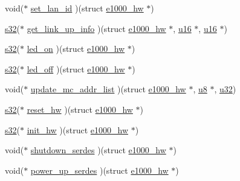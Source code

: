 \begin{DoxyCompactItemize}
\item 
void($\ast$ \hyperlink{structe1000__mac__operations_aa4701bf39adeb17df4723d7c8873eb51}{set\+\_\+lan\+\_\+id} )(struct \hyperlink{structe1000__hw}{e1000\+\_\+hw} $\ast$)
\item 
\hyperlink{lib_2igb_2e1000__osdep_8h_ae9b1af5c037e57a98884758875d3a7c4}{s32}($\ast$ \hyperlink{structe1000__mac__operations_ac33be4d35ec01cf9ebc0942a06c6e353}{get\+\_\+link\+\_\+up\+\_\+info} )(struct \hyperlink{structe1000__hw}{e1000\+\_\+hw} $\ast$, \hyperlink{lib_2igb_2e1000__osdep_8h_acdc9cf0314be0ae5a01d6d4379a95edd}{u16} $\ast$, \hyperlink{lib_2igb_2e1000__osdep_8h_acdc9cf0314be0ae5a01d6d4379a95edd}{u16} $\ast$)
\item 
\hyperlink{lib_2igb_2e1000__osdep_8h_ae9b1af5c037e57a98884758875d3a7c4}{s32}($\ast$ \hyperlink{structe1000__mac__operations_a1130a8a99a00a299152c532190a24ba1}{led\+\_\+on} )(struct \hyperlink{structe1000__hw}{e1000\+\_\+hw} $\ast$)
\item 
\hyperlink{lib_2igb_2e1000__osdep_8h_ae9b1af5c037e57a98884758875d3a7c4}{s32}($\ast$ \hyperlink{structe1000__mac__operations_a30ddd0007e69abb1c3e0f27a3204c3e4}{led\+\_\+off} )(struct \hyperlink{structe1000__hw}{e1000\+\_\+hw} $\ast$)
\item 
void($\ast$ \hyperlink{structe1000__mac__operations_a7da80f37f7dab7ae01648393f3d200c2}{update\+\_\+mc\+\_\+addr\+\_\+list} )(struct \hyperlink{structe1000__hw}{e1000\+\_\+hw} $\ast$, \hyperlink{lib_2igb_2e1000__osdep_8h_a8baca7e76da9e0e11ce3a275dd19130c}{u8} $\ast$, \hyperlink{lib_2igb_2e1000__osdep_8h_a64e91c10a0d8fb627e92932050284264}{u32})
\item 
\hyperlink{lib_2igb_2e1000__osdep_8h_ae9b1af5c037e57a98884758875d3a7c4}{s32}($\ast$ \hyperlink{structe1000__mac__operations_ab1bc8ebd08e9e205a337150d76b68a18}{reset\+\_\+hw} )(struct \hyperlink{structe1000__hw}{e1000\+\_\+hw} $\ast$)
\item 
\hyperlink{lib_2igb_2e1000__osdep_8h_ae9b1af5c037e57a98884758875d3a7c4}{s32}($\ast$ \hyperlink{structe1000__mac__operations_a942dab527d844af2505d62b9a98c9f36}{init\+\_\+hw} )(struct \hyperlink{structe1000__hw}{e1000\+\_\+hw} $\ast$)
\item 
void($\ast$ \hyperlink{structe1000__mac__operations_a13efb3290c2c9a895f5acdc3f8db8646}{shutdown\+\_\+serdes} )(struct \hyperlink{structe1000__hw}{e1000\+\_\+hw} $\ast$)
\item 
void($\ast$ \hyperlink{structe1000__mac__operations_a5e5165d542192868c5b17d04d7795097}{power\+\_\+up\+\_\+serdes} )(struct \hyperlink{structe1000__hw}{e1000\+\_\+hw} $\ast$)

\end{DoxyCompactItemize}
